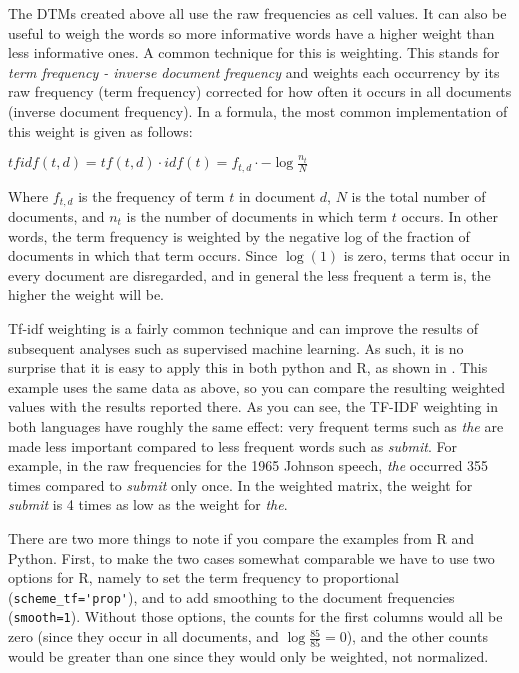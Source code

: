 The DTMs created above all use the raw frequencies as cell values.
It can also be useful to weigh the words so more informative words have a higher weight than less informative ones.
A common technique for this is  weighting.
This stands for \emph{term frequency - inverse document frequency} and weights each occurrency by its raw frequency (term frequency) corrected for how often it occurs in all documents (inverse document frequency). In a formula, the most common implementation of this weight is given as follows:

$tfidf(t,d)=tf(t,d)\cdot idf(t)=f_{t,d}\cdot -\log \frac{n_t}{N}$

Where $f_{t,d}$ is the frequency of term $t$ in document $d$, $N$ is the total number of documents, and $n_t$ is the number of documents in which term $t$ occurs. In other words, the term frequency is weighted by the negative log of the fraction of documents in which that term occurs. Since $\log(1)$ is zero, terms that occur in every document are disregarded, and in general the less frequent a term is, the higher the weight will be. 



Tf-idf weighting is a fairly common technique and can improve the results of subsequent analyses such as supervised machine learning.
As such, it is no surprise that it is easy to apply this in both python and R, as shown in .
This example uses the same data as  above, so you can compare the resulting weighted values with the results reported there.
As you can see, the TF-IDF weighting in both languages have roughly the same effect:
very frequent terms such as \emph{the} are made less important compared to less frequent words such as \emph{submit}.
For example, in the raw frequencies for the 1965 Johnson speech, \emph{the} occurred 355 times compared to \emph{submit} only once.
In the weighted matrix, the weight for \emph{submit} is 4 times as low as the weight for \emph{the}.

There are two more things to note if you compare the examples from R and Python.
First, to make the two cases somewhat comparable we have to use two options for R, namely to set the term frequency to proportional (\verb|scheme_tf='prop'|),
and to add smoothing to the document frequencies (\verb|smooth=1|).
Without those options, the counts for the first columns would all be zero (since they occur in all documents, and $\log \frac{85}{85}=0$),
and the other counts would be greater than one since they would only be weighted, not normalized.

